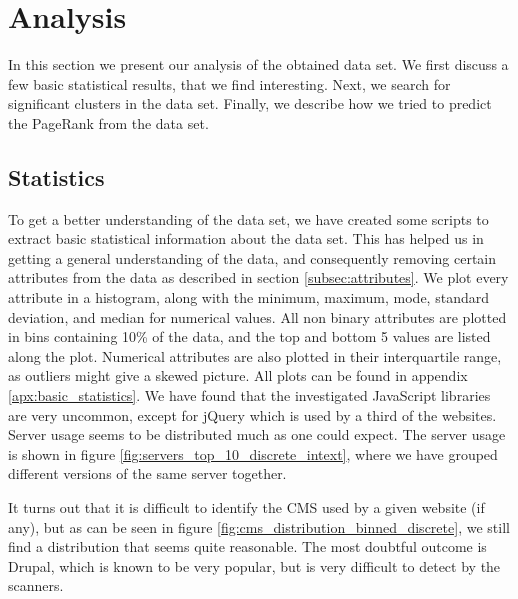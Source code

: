\section{Analysis}
\label{sec:analysis}

In this section we present our analysis of the obtained data set. We first discuss a few basic statistical results, that we find interesting. Next, we search for significant clusters in the data set. Finally, we describe how we tried to predict the {PageRank} from the data set.

\subsection{Statistics}
\label{subsec:statistics}

To get a better understanding of the data set, we have created some scripts to extract basic statistical information about the data set. This has helped us in getting a general understanding of the data, and consequently removing certain attributes from the data as described in section \ref{subsec:attributes}. We plot every attribute in a histogram, along with the minimum, maximum, mode, standard deviation, and median for numerical values. All non binary attributes are plotted in bins containing 10\% of the data, and the top and bottom 5 values are listed along the plot. Numerical attributes are also plotted in their interquartile range, as outliers might give a skewed picture. All plots can be found in appendix \ref{apx:basic_statistics}. We have found that the investigated JavaScript libraries are very uncommon, except for {jQuery} which is used by a third of the websites. Server usage seems to be distributed much as one could expect. The server usage is shown in figure \ref{fig:servers_top_10_discrete_intext}, where we have grouped different versions of the same server together.


It turns out that it is difficult to identify the {CMS} used by a given website (if any), but as can be seen in figure \ref{fig:cms_distribution_binned_discrete}, we still find a distribution that seems quite reasonable. The most doubtful outcome is Drupal, which is known to be very popular, but is very difficult to detect by the scanners.


